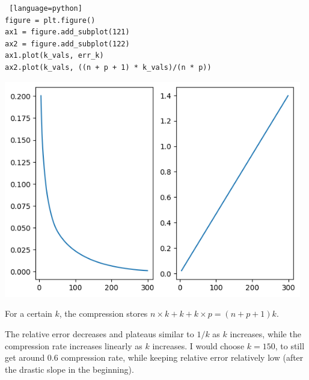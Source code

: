 \documentclass[a4paper, 12pt]{article}
\begin{document}
\begin{solution}
\begin{lstlisting} [language=python]
figure = plt.figure()
ax1 = figure.add_subplot(121)
ax2 = figure.add_subplot(122)
ax1.plot(k_vals, err_k)
ax2.plot(k_vals, ((n + p + 1) * k_vals)/(n * p))
\end{lstlisting}
    \begin{center}
        \includegraphics[width=13cm]{./figures/5.3c.png}
    \end{center}
    For a certain $k$, the compression stores $n \times k + k + k \times p = (n + p + 1)k$.
    
    The relative error decreases and plateaus similar to $1/k$ as $k$ increases, while the compression rate increases linearly as $k$ increases. I would choose $k = 150$, to still get around 0.6 compression rate, while keeping relative error relatively low (after the drastic slope in the beginning).
\end{solution}
\end{document}
